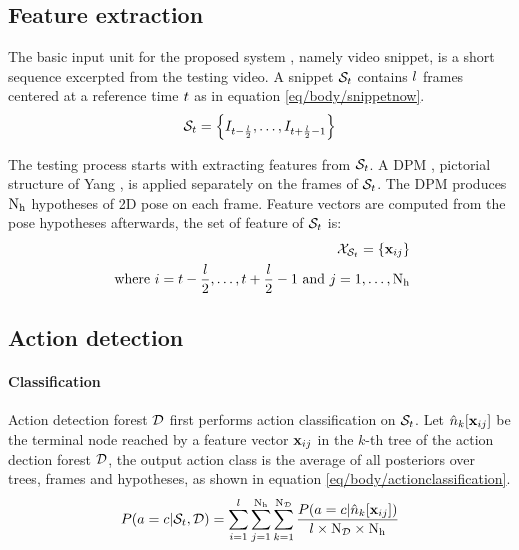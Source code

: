 \subsection{Feature extraction}

The basic input unit for the proposed system \cite{Schindler2008}, namely video snippet, is a short sequence excerpted from the testing video. A snippet $\mathcal{S}_{t}$ contains $l$ frames centered at a reference time $t$ as in equation \ref{eq/body/snippetnow}. 
\begin{equation}
	\label{eq/body/snippetnow}
	\mathcal{S}_{t} = \left\{ I_{t - \frac{l}{2}}, \dots, I_{t + \frac{l}{2} - 1} \right\}
\end{equation}

The testing process starts with extracting features from $\mathcal{S}_{t}$. A DPM , \eg pictorial structure of Yang \etal \cite{Yang2011}, is applied separately on the frames of $\mathcal{S}_{t}$. The DPM produces $\mathrm{N_{h}}$ hypotheses of 2D pose on each frame. Feature vectors are computed from the pose hypotheses afterwards, the set of feature of $\mathcal{S}_{t}$ is:
\begin{equation}
	\begin{aligned}
		\mathcal{X}_{\mathcal{S}_{t}} = \{ \mathbf{x}_{ij}\} \\ \mbox{ where } i =t-\frac{l}{2},\dots,t+\frac{l}{2}-1 \mbox{ and } j=1,\dots,\mathrm{N_{h}}
	\end{aligned}
\end{equation} 

\subsection{Action detection} 

\paragraph{Classification}
Action detection forest $\mathcal{D}$ first performs action classification on $\mathcal{S}_{t}$. Let ${\hat{n}}_k[\mathbf{x}_{ij}]$ be the terminal node reached by a feature vector $\mathbf{x}_{ij}$ in the $k$-th tree of the action dection forest $\mathcal{D}$, the output action class is the average of all posteriors over trees, frames and hypotheses, as shown in equation \ref{eq/body/actionclassification}. 
\begin{equation}
	\label{eq/body/actionclassification} 
	\begin{aligned}
	P(a & = c | \mathcal{S}_{t}, \mathcal{D}) = \displaystyle \sum_{i = 1}^{l} \sum_{j = 1}^{\mathrm{N_{h}}} \sum_{k = 1}^{\mathrm{N_{\mathcal{D}}}} \frac {P(a=c|{\hat{n}}_{k}[\mathbf{x}_{ij}])} {l\times\mathrm{N_{\mathcal{D}}}\times\mathrm{N_{h}}} \\ 
	\end{aligned}
\end{equation}

